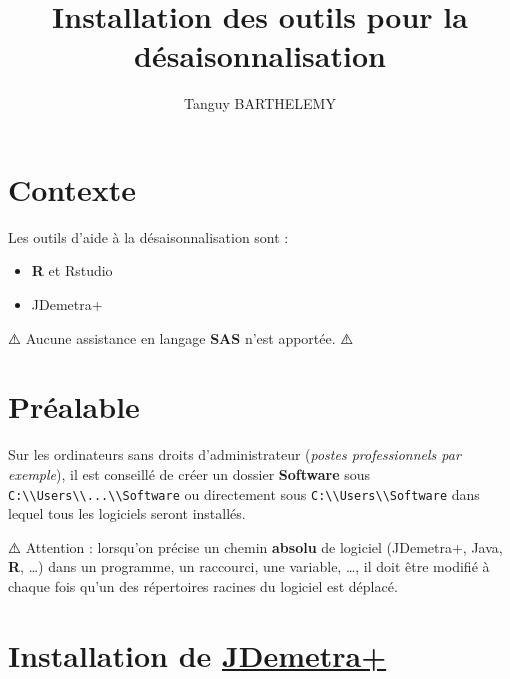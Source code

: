 \documentclass[
]{article}
\title{Installation des outils pour la désaisonnalisation}
\author{Tanguy BARTHELEMY}
\date{}
\providecommand{\tightlist}{%
  \setlength{\itemsep}{0pt}\setlength{\parskip}{0pt}}
\providecommand{\xelatexemojipath}[1]{images/#1}
\begin{document}
\maketitle


\renewcommand{\xelatexemojipath}[1]{../xelatex-emoji/images/#1}

\hypertarget{contexte}{%
\section*{Contexte}\label{contexte}}

Les outils d'aide à la désaisonnalisation sont :

\begin{itemize}
\tightlist
\item
  \textbf{R} et Rstudio
\item
  JDemetra+
\end{itemize}

⚠️ Aucune assistance en langage \textbf{SAS} n'est apportée. ⚠️

\hypertarget{pruxe9alable}{%
\section*{Préalable}\label{pruxe9alable}}

Sur les ordinateurs sans droits d'administrateur (\emph{postes
professionnels par exemple}), il est conseillé de créer un dossier
\textbf{Software} sous
\textcolor{windows_path_color}{\nolinkurl{C:\\Users\\...\\Software}} ou
directement sous
\textcolor{windows_path_color}{\nolinkurl{C:\\Users\\Software}} dans
lequel tous les logiciels seront installés.

⚠️ Attention : lorsqu'on précise un chemin \textbf{absolu} de logiciel
(JDemetra+, Java, \textbf{R}, \ldots) dans un programme, un raccourci,
une variable, \ldots, il doit être modifié à chaque fois qu'un des
répertoires racines du logiciel est déplacé.

\hypertarget{installation-de-jdemetra}{%
\section{\texorpdfstring{Installation de
\href{https://github.com/jdemetra/jdemetra-app}{JDemetra+}}{Installation de JDemetra+}}\label{installation-de-jdemetra}}
\end{document}
